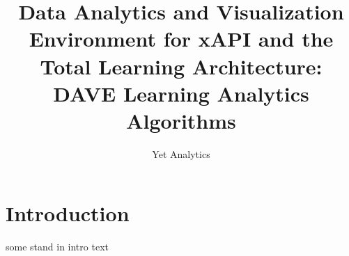 \documentclass{article}
\title{Data Analytics and Visualization Environment for xAPI and the Total Learning Architecture: DAVE Learning Analytics Algorithms}
\author{Yet Analytics}
\begin{document}
\begin{titlepage}
  \maketitle
\end{titlepage}

\section*{Introduction}

some stand in intro text












\end{document}

